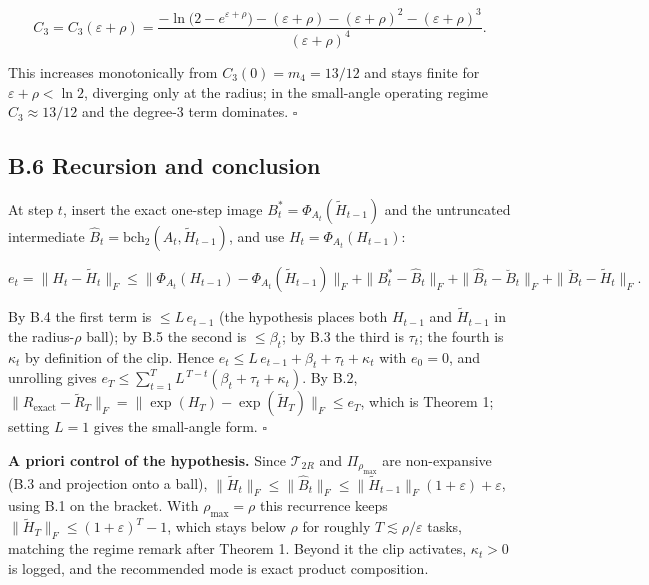 \documentclass[
]{article}
\begin{document}
\[
C_3=C_3(\varepsilon+\rho)=\frac{-\ln\!\big(2-e^{\varepsilon+\rho}\big)-(\varepsilon+\rho)-(\varepsilon+\rho)^2-(\varepsilon+\rho)^3}{(\varepsilon+\rho)^4}.
\]

This increases monotonically from \(C_3(0)=m_4=13/12\) and stays finite for \(\varepsilon+\rho<\ln 2\), diverging only at the radius; in the small-angle operating regime \(C_3\approx 13/12\) and the degree-3 term dominates. \(\square\)

\subsection{B.6 Recursion and conclusion}\label{b.6-recursion-and-conclusion}

At step \(t\), insert the exact one-step image \(B^\ast_t=\Phi_{A_t}(\tilde{H}_{t-1})\) and the untruncated intermediate \(\hat{B}_t=\mathrm{bch}_2(A_t,\tilde{H}_{t-1})\), and use \(H_t=\Phi_{A_t}(H_{t-1})\):

\[
e_t=\|H_t-\tilde{H}_t\|_F\leq\|\Phi_{A_t}(H_{t-1})-\Phi_{A_t}(\tilde{H}_{t-1})\|_F+\|B^\ast_t-\hat{B}_t\|_F+\|\hat{B}_t-\breve{B}_t\|_F+\|\breve{B}_t-\tilde{H}_t\|_F.
\]

By B.4 the first term is \(\leq L\,e_{t-1}\) (the hypothesis places both \(H_{t-1}\) and \(\tilde{H}_{t-1}\) in the radius-\(\rho\) ball); by B.5 the second is \(\leq\beta_t\); by B.3 the third is \(\tau_t\); the fourth is \(\kappa_t\) by definition of the clip. Hence \(e_t\leq L\,e_{t-1}+\beta_t+\tau_t+\kappa_t\) with \(e_0=0\), and unrolling gives \(e_T\leq\sum_{t=1}^{T}L^{\,T-t}(\beta_t+\tau_t+\kappa_t)\). By B.2, \(\|R_{\mathrm{exact}}-\tilde{R}_T\|_F=\|\exp(H_T)-\exp(\tilde{H}_T)\|_F\leq e_T\), which is Theorem 1; setting \(L=1\) gives the small-angle form. \(\square\)

\textbf{A priori control of the hypothesis.} Since \(\mathcal{T}_{2R}\) and \(\Pi_{\rho_{\max}}\) are non-expansive (B.3 and projection onto a ball), \(\|\tilde{H}_t\|_F\leq\|\hat{B}_t\|_F\leq\|\tilde{H}_{t-1}\|_F(1+\varepsilon)+\varepsilon\), using B.1 on the bracket. With \(\rho_{\max}=\rho\) this recurrence keeps \(\|\tilde{H}_T\|_F\leq(1+\varepsilon)^T-1\), which stays below \(\rho\) for roughly \(T\lesssim\rho/\varepsilon\) tasks, matching the regime remark after Theorem 1. Beyond it the clip activates, \(\kappa_t>0\) is logged, and the recommended mode is exact product composition.
\end{document}
